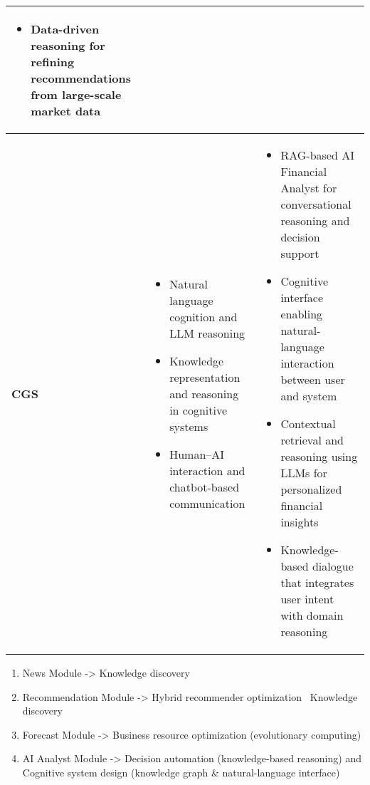 \begin{table}[H]
\begin{tabular}{|p{2.8cm}|p{5cm}|p{7cm}|}
\begin{itemize}
  \item Data-driven reasoning for refining recommendations from large-scale market data
\end{itemize}
\\
\hline
\textbf{CGS} &
\begin{itemize}
  \item Natural language cognition and LLM reasoning
  \item Knowledge representation and reasoning in cognitive systems
  \item Human–AI interaction and chatbot-based communication
\end{itemize}
&
\begin{itemize}
  \item RAG-based AI Financial Analyst for conversational reasoning and decision support
  \item Cognitive interface enabling natural-language interaction between user and system
  \item Contextual retrieval and reasoning using LLMs for personalized financial insights
  \item Knowledge-based dialogue that integrates user intent with domain reasoning
\end{itemize}
\\
\hline
\end{tabular}
\end{table}

\begin{enumerate}
    \item News Module -> Knowledge discovery
	\item Recommendation Module -> Hybrid recommender optimization \ Knowledge discovery
	\item Forecast Module -> Business resource optimization (evolutionary computing)
	\item AI Analyst Module -> Decision automation (knowledge-based reasoning) and Cognitive system design (knowledge graph \& natural-language interface)
\end{enumerate}
